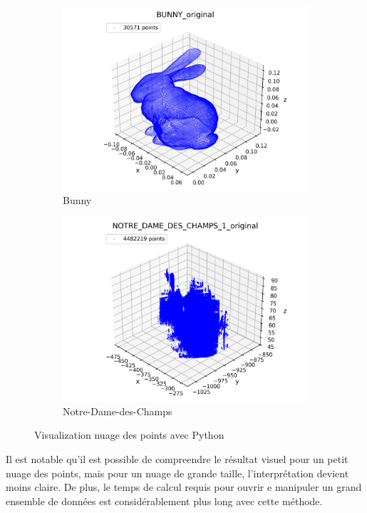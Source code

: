\documentclass[../5RO17_TP4.tex]{subfiles}
\begin{document}
\begin{figure}[H]
    \centering
    \begin{subfigure}[b]{0.475\textwidth}
        \centering
        \includegraphics[width=\linewidth]{images/BUNNY_original.png}
        \caption{Bunny}
        \label{fig:python_bunny}
    \end{subfigure}\hfill
    \begin{subfigure}[b]{0.475\textwidth}
        \centering
        \includegraphics[width=\linewidth]{images/NOTRE_DAME_DES_CHAMPS_1_original.png}
        \caption{Notre-Dame-des-Champs}
        \label{fig:python_ndc}
    \end{subfigure}
    \caption{Visualization nuage des points avec Python}
    \label{fig:python_plots}
\end{figure}
\noindent Il est notable qu'il est possible de compreendre le résultat visuel pour un petit nuage des points, mais pour un nuage de grande taille, l'interprétation devient moins claire. De plus, le temps de calcul requis pour ouvrir e manipuler un grand ensemble de données est considérablement plus long avec cette méthode.
\end{document}
